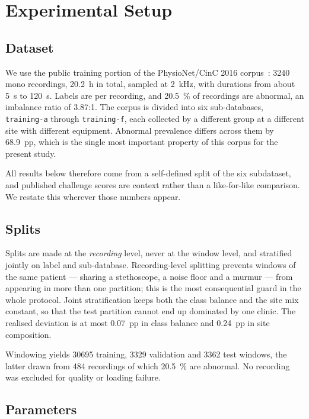 \section{Experimental Setup}
\label{sec:setup}

\subsection{Dataset}

We use the public training portion of the PhysioNet/CinC 2016
corpus~\cite{liu2016open,goldberger2000physiobank}: 3240 mono recordings,
\SI{20.2}{\hour} in total, sampled at \SI{2}{\kilo\hertz}, with durations from
about \SI{5}{\second} to \SI{120}{\second}. Labels are per recording, and
\SI{20.5}{\percent} of recordings are abnormal, an imbalance ratio of
\num{3.87}:1. The corpus is divided into six sub-databases, \texttt{training-a}
through \texttt{training-f}, each collected by a different group at a different
site with different equipment. Abnormal prevalence differs across them by
\SI{68.9}{pp}, which is the single most important property of this corpus for
the present study.

All results below therefore come from a self-defined split of the six
subdataset, and published challenge scores are context rather than a
like-for-like comparison. We restate this wherever those numbers appear.

\subsection{Splits}

Splits are made at the \emph{recording} level, never at the window level, and
stratified jointly on label and sub-database. Recording-level splitting prevents
windows of the same patient --- sharing a stethoscope, a noise floor and a
murmur --- from appearing in more than one partition; this is the most
consequential guard in the whole protocol. Joint stratification keeps both the
class balance and the site mix constant, so that the test partition cannot end
up dominated by one clinic. The realised deviation is at most \SI{0.07}{pp} in
class balance and \SI{0.24}{pp} in site composition.

Windowing yields \num{30695} training, \num{3329} validation and \num{3362} test
windows, the latter drawn from 484 recordings of which \SI{20.5}{\percent} are
abnormal. No recording was excluded for quality or loading failure.

\subsection{Parameters}

